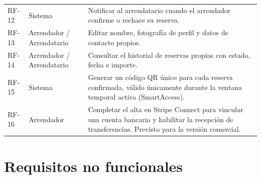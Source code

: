 \begin{table}[htbp]
\begin{tabularx}{\textwidth}{llX}
    RF-12       & Sistema                   & Notificar al arrendatario cuando el arrendador confirme o rechace su reserva.                                                                                                                                                                                                             \\
    \rowcolor{gray!5}
    RF-13       & Arrendador / Arrendatario & Editar nombre, fotografía de perfil y datos de contacto propios.                                                                                                                                                                                                                          \\
    RF-14       & Arrendador / Arrendatario & Consultar el historial de reservas propias con estado, fecha e importe.                                                                                                                                                                                                                   \\
    \rowcolor{gray!5}
    RF-15       & Sistema                   & Generar un código QR único para cada reserva confirmada, válido únicamente durante la ventana temporal activa (SmartAccess).                                                                                                                                                              \\
    RF-16       & Arrendador                & Completar el alta en Stripe Connect para vincular una cuenta bancaria y habilitar la recepción de transferencias. Previsto para la versión comercial.                                                                                                                                     \\
    \bottomrule
  \end{tabularx}
\end{table}

\section{Requisitos no funcionales}
\label{sec:requisitos_no_funcionales}

